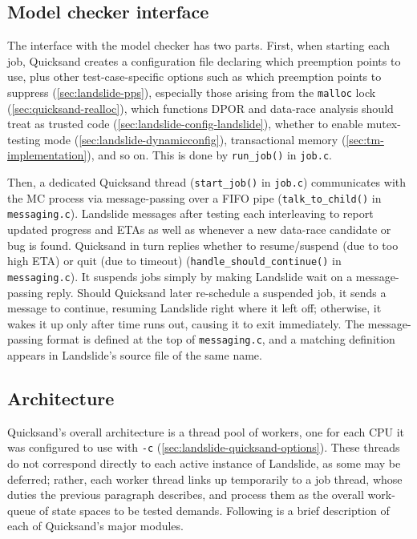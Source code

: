 \subsection{Model checker interface}
\label{sec:quicksand-impl-mc}

The interface with the model checker has two parts.
First, when starting each job, Quicksand creates a configuration file declaring which preemption points to use,
plus other test-case-specific options such as
which preemption points to suppress (\cref{sec:landslide-pps}),
especially those arising from the {\tt malloc} lock (\cref{sec:quicksand-realloc}),
which functions DPOR and data-race analysis should treat as trusted code (\cref{sec:landslide-config-landslide}),
whether to enable mutex-testing mode (\cref{sec:landslide-dynamicconfig}),
transactional memory (\cref{sec:tm-implementation}),
and so on.
This is done by {\tt run\_job()} in {\tt job.c}.

Then, a dedicated Quicksand thread
({\tt start\_job()} in {\tt job.c})
communicates with the MC process via message-passing
over a FIFO pipe %
({\tt talk\_to\_child()} in {\tt messaging.c}).
Landslide messages after testing each interleaving to report updated progress and ETAs
as well as whenever a new data-race candidate or bug is found.
Quicksand in turn replies whether to resume/suspend (due to too high ETA) or quit (due to timeout)
({\tt handle\_should\_continue()} in {\tt messaging.c}).
It suspends jobs simply by making Landslide wait on a message-passing reply.
Should Quicksand later re-schedule a suspended job, it sends a message to continue,
resuming Landslide right where it left off;
otherwise, it wakes it up only after time runs out, causing it to exit immediately.
The message-passing format is defined at the top of {\tt messaging.c},
and a matching definition appears in Landslide's source file of the same name.

\subsection{Architecture}

Quicksand's overall architecture is a thread pool of workers,
one for each CPU it was configured to use with {\tt -c} (\cref{sec:landslide-quicksand-options}).
These threads do not correspond directly to each active instance of Landslide,
as some may be deferred;
rather, each worker thread links up temporarily to a job thread, whose duties the previous paragraph describes,
and process them as the overall work-queue of state spaces to be tested demands.
Following is a brief description of each of Quicksand's major modules.

